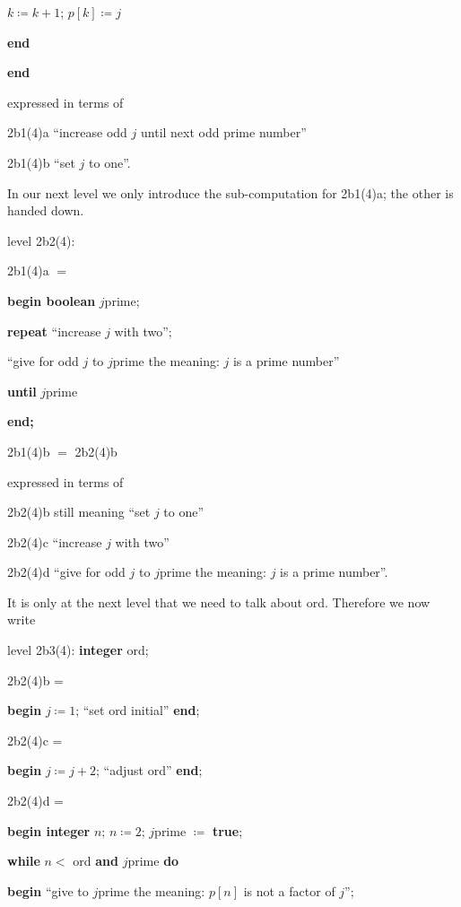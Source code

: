 \noindent
\quad\quad $k \coloneq k + 1$; $p[k] \coloneq j$

\noindent
\quad\textbf{end}

\noindent
\textbf{end}

\noindent
expressed in terms of

\noindent
2b1(4)a\tabto{5em} ``increase odd $j$ until next odd prime number''

\noindent
2b1(4)b\tabto{5em} ``set $j$ to one''.

In our next level we only introduce the sub-computation for 2b1(4)a; the other is handed down.

\noindent
level 2b2(4):

\noindent
2b1(4)a $=$

\noindent
\textbf{begin boolean} $j$prime;

\noindent
\quad\textbf{repeat} ``increase $j$ with two'';

\noindent
\quad\quad ``give for odd $j$ to $j$prime the meaning: $j$ is a prime number''

\noindent
\quad\textbf{until} $j$prime

\noindent
\textbf{end;}

\noindent
2b1(4)b $=$ 2b2(4)b

\noindent
expressed in terms of

\noindent
2b2(4)b\tabto{5em} still meaning ``set $j$ to one''

\noindent
2b2(4)c\tabto{5em} ``increase $j$ with two''

\noindent
2b2(4)d\tabto{5em} ``give for odd $j$ to $j$prime the meaning: $j$ is a prime number''.

It is only at the next level that we need to talk about ord. Therefore we now write

\noindent
level 2b3(4): \textbf{integer} ord;

\noindent
2b2(4)b =

\noindent
\textbf{begin} $j \coloneq 1$; ``set ord initial'' \textbf{end};

\noindent
2b2(4)c =

\noindent
\textbf{begin} $j \coloneq j + 2$; ``adjust ord'' \textbf{end};

\noindent
2b2(4)d =

\noindent
\textbf{begin integer} $n$; $n \coloneq 2$; $j$prime $\coloneq$ \textbf{true};

\noindent
\quad\textbf{while} $n <$ ord \textbf{and} $j$prime \textbf{do}

\noindent
\quad\quad\textbf{begin} ``give to $j$prime the meaning: $p[n]$ is not a factor of $j$'';

